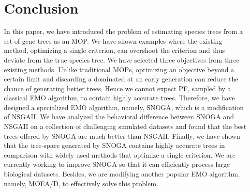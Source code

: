 \section{Conclusion} %
In this paper, we have introduced the problem of estimating species trees from a set of gene trees as an MOP. We have shown examples where the existing method, optimizing a single criterion, can overshoot the criterion and thus deviate from the true species tree. We have selected three objectives from three existing methods. Unlike traditional MOPs, optimizing an objective beyond a certain limit and discarding a dominated at an early generation can reduce the chance of generating better trees. Hence we cannot expect PF, sampled by a classical EMO algorithm, to contain highly accurate trees. Therefore, we have designed a specialized EMO algorithm, namely, SNOGA, which is a modification of NSGAII. %
We have analyzed the behavioral difference between SNOGA and NSGAII on a collection of challenging simulated datasets and found that the best trees offered by SNOGA are much better than NSGAII. Finally, we have shown that the tree-space generated by SNOGA contains highly accurate trees in comparison with widely used methods that optimize a single criterion. We are currently working to improve SNOGA so that it can efficiently process large biological datasets. Besides, we are modifying another popular EMO algorithm, namely, MOEA/D, to effectively solve this problem.


